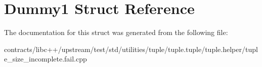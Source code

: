 \hypertarget{struct_dummy1}{}\section{Dummy1 Struct Reference}
\label{struct_dummy1}


The documentation for this struct was generated from the following file\+:\begin{DoxyCompactItemize}
\item 
contracts/libc++/upstream/test/std/utilities/tuple/tuple.\+tuple/tuple.\+helper/tuple\+\_\+size\+\_\+incomplete.\+fail.\+cpp\end{DoxyCompactItemize}
